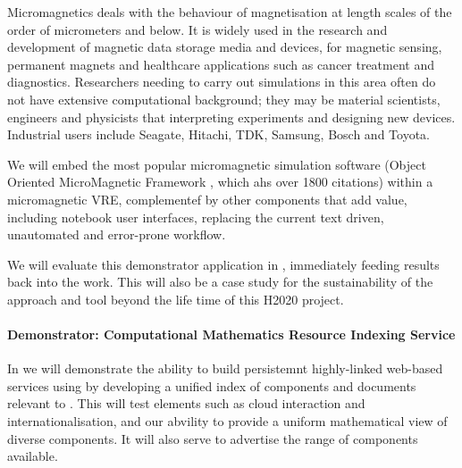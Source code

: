 Micromagnetics deals with the behaviour of
magnetisation at length scales of the order of
micrometers and below. It is widely used in the research and
development of magnetic data storage media and devices, for magnetic
sensing, permanent magnets and healthcare applications such as cancer
treatment and diagnostics. 
Researchers needing to carry out simulations in this area often do not
have  extensive computational background; they may be
material scientists, engineers and physicists that
interpreting  experiments and designing new devices. Industrial users include Seagate, Hitachi,
TDK, Samsung, Bosch and Toyota.


We will embed the most popular micromagnetic
simulation software (Object Oriented MicroMagnetic Framework
\cite{OOMMF-url}, which ahs over 1800 citations) within a micromagnetic VRE, complementef by other
components that add value, including notebook user interfaces,
replacing the current text driven, unautomated and error-prone workflow.

We will evaluate this demonstrator application in 
, immediately feeding
results back into the \TheProject work. This will also
be a case study for the sustainability of the approach and tool beyond
the life time of this H2020 project.

\paragraph{Demonstrator: Computational Mathematics Resource Indexing
Service}

In  
we will demonstrate the ability to build persistemnt highly-linked
web-based services using \TheProject by developing a unified index of
components and documents relevant to \TheProject. This will test
elements such as cloud interaction and internationalisation, and our
abvility to provide a uniform mathematical view of diverse
components. It will also serve
to advertise the range of components available.

